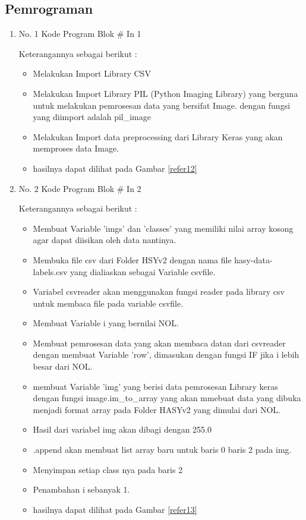\subsection{Pemrograman}
\begin{enumerate}

\item No. 1 Kode Program Blok \# In 1
\par 
Keterangannya sebagai berikut :
\begin{itemize}
\item Melakukan Import Library CSV
\item Melakukan Import Library PIL (Python Imaging Library) yang berguna untuk melakukan pemrosesan data yang bersifat Image. dengan fungsi yang diimport adalah pil\_image
\item Melakukan Import data preprocessing dari Library Keras yang akan memproses data Image.
\item hasilnya dapat dilihat pada Gambar \ref{refer12}
\end{itemize}



\item No. 2 Kode Program Blok \# In 2
\par 
Keterangannya sebagai berikut :
\begin{itemize}
\item Membuat Variable 'imgs' dan 'classes' yang memiliki nilai array kosong agar dapat diisikan oleh data nantinya.
\item Membuka file csv dari Folder HSYv2 dengan nama file hasy-data-labels.csv yang dialiaskan sebagai Variable csvfile.
\item Variabel csvreader akan menggunakan fungsi reader pada library csv untuk membaca file pada variable csvfile.
\item Membuat Variable i yang bernilai NOL.
\item Membuat pemrosesan data yang akan membaca datan dari csvreader dengan membuat Variable 'row', dimasukan dengan fungsi IF jika i lebih besar dari NOL.
\item membuat Variable 'img' yang berisi data pemrosesan Library keras dengan fungsi image.im\_to\_array yang akan mmebuat data yang dibuka menjadi format array pada Folder HASYv2 yang dimulai dari NOL.
\item Hasil dari variabel img akan dibagi dengan 255.0
\item .append akan membuat list array baru untuk baris 0 baris 2 pada img.
\item Menyimpan setiap class nya  pada baris 2
\item Penambahan i sebanyak 1. 
\item hasilnya dapat dilihat pada Gambar \ref{refer13}
\end{itemize}




\end{enumerate}
